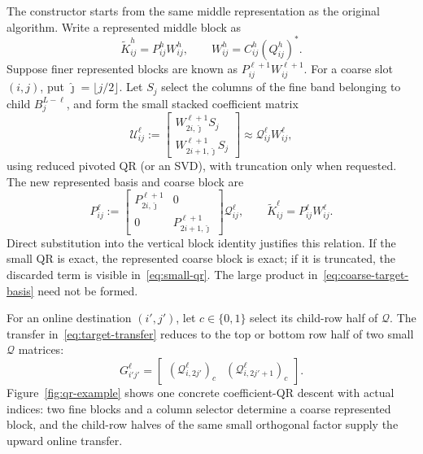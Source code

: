 \documentclass[11pt,a4paper]{article}
\begin{document}
The constructor starts from the same middle representation as the original algorithm. Write a represented middle block as
\[
 \widetilde K_{ij}^h=P_{ij}^hW_{ij}^h,
 \qquad W_{ij}^h=C_{ij}^h(Q_{ij}^h)^*.
\]
Suppose finer represented blocks are known as $P_{ij}^{\ell+1}W_{ij}^{\ell+1}$. For a coarse slot $(i,j)$, put $\widehat\jmath=\lfloor j/2\rfloor$. Let $S_j$ select the columns of the fine band belonging to child $B_j^{L-\ell}$, and form the small stacked coefficient matrix
\begin{equation}
 \mathcal U_{ij}^{\ell}:=
 \begin{bmatrix}
 W_{2i,\widehat\jmath}^{\ell+1}S_j\\[2pt]
 W_{2i+1,\widehat\jmath}^{\ell+1}S_j
 \end{bmatrix}
 \approx\mathcal Q_{ij}^{\ell}W_{ij}^{\ell},
 \label{eq:small-qr}
\end{equation}
using reduced pivoted QR (or an SVD), with truncation only when requested. The new represented basis and coarse block are
\begin{equation}
 P_{ij}^{\ell}:=
 \begin{bmatrix}P_{2i,\widehat\jmath}^{\ell+1}&0\\0&P_{2i+1,\widehat\jmath}^{\ell+1}\end{bmatrix}
 \mathcal Q_{ij}^{\ell},
 \qquad
 \widetilde K_{ij}^{\ell}=P_{ij}^{\ell}W_{ij}^{\ell}.
 \label{eq:coarse-target-basis}
\end{equation}
Direct substitution into the vertical block identity justifies this relation. If the small QR is exact, the represented coarse block is exact; if it is truncated, the discarded term is visible in~\eqref{eq:small-qr}. The large product in~\eqref{eq:coarse-target-basis} need not be formed.

For an online destination $(i',j')$, let $c\in\{0,1\}$ select its child-row half of $\mathcal Q$. The transfer in~\eqref{eq:target-transfer} reduces to the top or bottom row half of two small $\mathcal Q$ matrices:
\begin{equation}
 G_{i'j'}^\ell=
 \begin{bmatrix}(\mathcal Q_{i,2j'}^\ell)_c&(\mathcal Q_{i,2j'+1}^\ell)_c\end{bmatrix}.
 \label{eq:qr-target-transfer}
\end{equation}
Figure~\ref{fig:qr-example} shows one concrete coefficient-QR descent with actual indices: two fine blocks and a column selector determine a coarse represented block, and the child-row halves of the same small orthogonal factor supply the upward online transfer.
\end{document}
